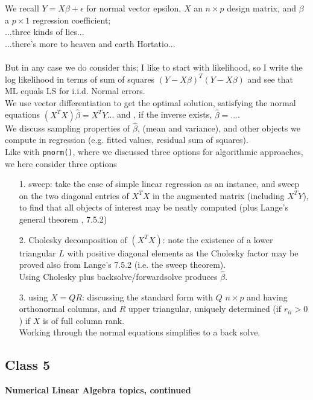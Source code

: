 \documentclass[11pt,a4paper]{article}
\begin{document}
We recall $Y = X\beta + \epsilon$ for normal vector epsilon,  $X$ an $n\times p$ design matrix, and $\beta$ a $p\times 1$ regression coefficient;\\
...three kinds of lies...\\
...there's more to heaven and earth Hortatio... \\\\
But in any case we do consider this; I like to start with likelihood, so I write the log likelihood in terms of sum of squares $(Y-X\beta)^T (Y-X\beta)$ and see that ML equals LS for i.i.d. Normal errors.\\
We use  vector differentiation to get the optimal solution, satisfying the normal equations $(X^T X)\hat{\beta} = X^T Y$... and , if the inverse exists, $ \hat{\beta} = ...$.\\
We discuss sampling properties of $\hat{\beta}$, (mean and variance), and other objects we compute in regression (e.g. fitted values, residual sum of squares).\\
Like with \texttt{pnorm()}, where we discussed three options for algorithmic approaches, we here consider three options
\begin{enumerate}
\item[1.] sweep: take the case of simple linear regression as an instance, and sweep on the two diagonal entries of $X^T X$ in the augmented matrix (including $X^T Y$), to find that all objects of interest may be neatly computed (plus Lange's general theorem , 7.5.2)
\item[2.] Cholesky decomposition of $(X^T X)$: note the existence of a lower triangular $L$ with positive diagonal elements as the Cholesky factor may be proved also from Lange's 7.5.2 (i.e. the sweep theorem).\\
Using Cholesky plus backsolve/forwardsolve produces $\hat{\beta}$.
\item[3.] using $X = QR$: discussing the standard form with $Q$ $n \times p$ and having orthonormal columns, and $R$ upper triangular, uniquely determined (if $r_{ii}>0$) if $X$ is of full column rank.\\
Working through the normal equations simplifies to a back solve.
\end{enumerate}
 

\subsection*{Class 5}
\textbf{Numerical Linear Algebra topics, continued}\\\\
\end{document}
